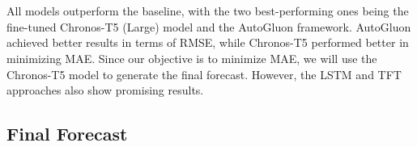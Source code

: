 \documentclass[a4paper]{article}
\begin{document}
    \begin{center}
    \end{center}
    { \hspace*{\fill} \\}
    
    \begin{center}
    \end{center}
    { \hspace*{\fill} \\}
    
    All models outperform the baseline, with the two best-performing ones
being the fine-tuned Chronos-T5 (Large) model and the AutoGluon
framework. AutoGluon achieved better results in terms of RMSE, while
Chronos-T5 performed better in minimizing MAE. Since our objective is to
minimize MAE, we will use the Chronos-T5 model to generate the final
forecast. However, the LSTM and TFT approaches also show promising
results.

    \subsection{Final Forecast}\label{final-forecast}
\end{document}
